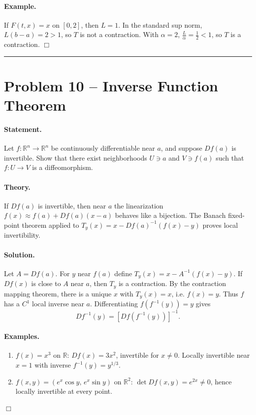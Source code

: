 \documentclass[12pt,a4paper]{article}
\theoremstyle{plain}
\theoremstyle{definition}
\theoremstyle{remark}
\theoremstyle{remark}
\begin{document}
\paragraph{Example.}
If $F(t,x)=x$ on $[0,2]$, then $L=1$.
In the standard sup norm, $L(b-a)=2>1$, so $T$ is not a contraction.
With $\alpha=2$, $\frac{L}{\alpha}=\frac12<1$, so $T$ is a contraction.
\hfill$\Box$

\bigskip\hrule\bigskip

\section*{Problem 10 -- Inverse Function Theorem}

\paragraph{Statement.}
Let $f:\mathbb{R}^n\to\mathbb{R}^n$ be continuously differentiable near $a$,
and suppose $Df(a)$ is invertible.
Show that there exist neighborhoods $U\ni a$ and $V\ni f(a)$ such that
$f:U\to V$ is a diffeomorphism.

\paragraph{Theory.}
If $Df(a)$ is invertible, then near $a$ the linearization
$f(x)\approx f(a)+Df(a)(x-a)$ behaves like a bijection.
The Banach fixed-point theorem applied to
$T_y(x)=x-Df(a)^{-1}(f(x)-y)$ proves local invertibility.

\paragraph{Solution.}
Let $A=Df(a)$.  For $y$ near $f(a)$ define $T_y(x)=x-A^{-1}(f(x)-y)$.
If $Df(x)$ is close to $A$ near $a$, then $T_y$ is a contraction.
By the contraction mapping theorem, there is a unique $x$ with $T_y(x)=x$, i.e. $f(x)=y$.
Thus $f$ has a $C^1$ local inverse near $a$.
Differentiating $f(f^{-1}(y))=y$ gives
\[
Df^{-1}(y)=[Df(f^{-1}(y))]^{-1}.
\]

\paragraph{Examples.}
\begin{enumerate}\setlength{\itemsep}{3pt}
	\item $f(x)=x^3$ on $\mathbb{R}$: $Df(x)=3x^2$, invertible for $x\ne0$.  
	Locally invertible near $x=1$ with inverse $f^{-1}(y)=y^{1/3}$.
	\item $f(x,y)=(e^x\cos y,\,e^x\sin y)$ on $\mathbb{R}^2$:
	$\det Df(x,y)=e^{2x}\ne0$, hence locally invertible at every point.
\end{enumerate}
\hfill$\Box$
\end{document}
